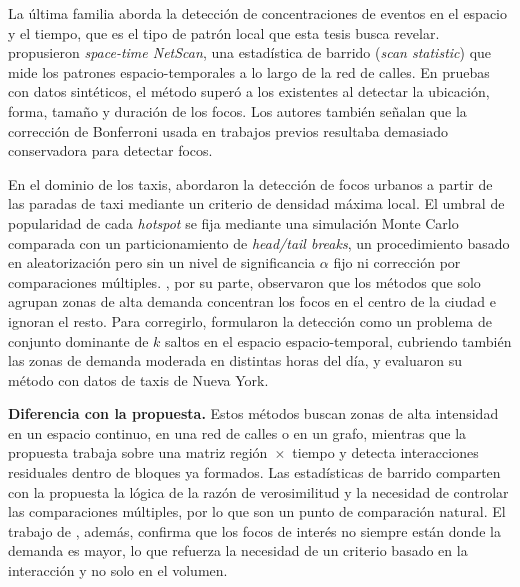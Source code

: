 La última familia aborda la detección de concentraciones de eventos en el
espacio y el tiempo, que es el tipo de patrón local que esta tesis busca
revelar. \cite{Shiode2022} propusieron \emph{space-time NetScan}, una
estadística de barrido (\emph{scan statistic}) que mide los patrones
espacio-temporales a lo largo de la red de calles. En pruebas con datos
sintéticos, el método superó a los existentes al detectar la ubicación,
forma, tamaño y duración de los focos. Los autores también señalan que la
corrección de Bonferroni usada en trabajos previos resultaba demasiado
conservadora para detectar focos.

En el dominio de los taxis, \cite{Chen2021hotspots} abordaron la detección
de focos urbanos a partir de las paradas de taxi mediante un criterio de
densidad máxima local. El umbral de popularidad de cada \emph{hotspot} se fija
mediante una simulación Monte Carlo comparada con un particionamiento de
\emph{head/tail breaks}, un procedimiento basado en aleatorización pero sin un
nivel de significancia $\alpha$ fijo ni corrección por comparaciones
múltiples. \cite{Mishra2025}, por su parte, observaron que los métodos que
solo agrupan zonas de alta demanda concentran los focos en el centro de la
ciudad e ignoran el resto. Para corregirlo, formularon la detección como un
problema de conjunto dominante de $k$ saltos en el espacio espacio-temporal,
cubriendo también las zonas de demanda moderada en distintas horas del día,
y evaluaron su método con datos de taxis de Nueva York.

\textbf{Diferencia con la propuesta.} Estos métodos buscan zonas de alta
intensidad en un espacio continuo, en una red de calles o en un grafo,
mientras que la propuesta trabaja sobre una matriz región~$\times$~tiempo y
detecta interacciones residuales dentro de bloques ya formados. Las
estadísticas de barrido comparten con la propuesta la lógica de la razón de
verosimilitud y la necesidad de controlar las comparaciones múltiples, por
lo que son un punto de comparación natural. El trabajo de
\cite{Mishra2025}, además, confirma que los focos de interés no siempre
están donde la demanda es mayor, lo que refuerza la necesidad de un
criterio basado en la interacción y no solo en el volumen.

